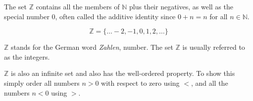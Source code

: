 \documentclass[11pt, oneside]{article}
\begin{document}
The set $\mathbb{Z}$ contains all the members of $\mathbb{N}$ plus their negatives, as well as the special number $0$, often called the additive identity since $0 + n = n$ for all $n \in \mathbb{N}$.

\[ \mathbb{Z} = \{ \dots -2, -1, 0, 1, 2, \dots \} \]

$\mathbb{Z}$ stands for the German word \emph{Zahlen}, number.  The set $\mathbb{Z}$ is usually referred to as the integers.

$\mathbb{Z}$ is also an infinite set and also has the well-ordered property.  To show this simply order all numbers $n > 0$ with respect to zero using $<$, and all the numbers $n < 0$ using $>$.
\end{document}
